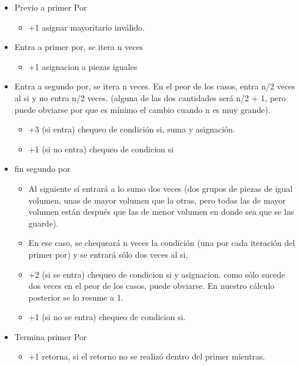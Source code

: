 \documentclass{article}
\begin{document}
\begin{itemize}
    \item Previo a primer Por
    \begin{itemize}
        \item +1 asignar mayoritario inválido.
    \end{itemize}
    \item Entra a primer por, se itera n veces
    \begin{itemize}
        \item +1 asignacion a piezas iguales
    \end{itemize}
    \item Entra a segundo por, se itera n veces. En el peor de los casos, entra n/2 veces al si y no entra n/2 veces. (alguna de las dos cantidades será n/2 + 1, pero puede obviarse por que es mínimo el cambio cuando n es muy grande).
    \begin{itemize}
        \item +3 (si entra) chequeo de condición si, suma y asignación. 
        \item +1 (si no entra) chequeo de condicion si       
    \end{itemize}
    \item fin segundo por
    \begin{itemize}
        \item Al siguiente sí entrará a lo sumo dos veces (dos grupos de piezas de igual volumen, unas de mayor volumen que la otras, pero todas las de mayor volumen están después que las de menor volumen en donde sea que se las guarde).
        \item En ese caso, se chequeará n veces la condición (una por cada iteración del primer por) y se entrará sólo dos veces al si.
        \item +2 (si se entra) chequeo de condicion si y asignacion. como sólo sucede dos veces en el peor de los casos, puede obviarse. En nuestro cálculo posterior se lo resume a 1.
        \item +1 (si no se entra) chequeo de condicion si.
    \end{itemize}
    \item Termina primer Por
    \begin{itemize}
        \item +1 retorna, si el retorno no se realizó dentro del primer mientras.
    \end{itemize}

\end{itemize}
\end{document}
